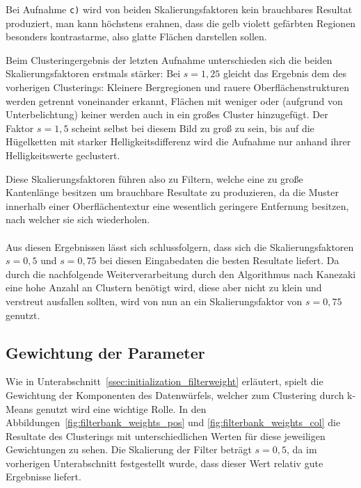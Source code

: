 Bei Aufnahme \texttt{c)} wird von beiden Skalierungsfaktoren kein brauchbares Resultat produziert, man kann höchstens erahnen, dass die gelb \bzw violett gefärbten Regionen besonders kontrastarme, also glatte Flächen darstellen sollen.

Beim Clusteringergebnis der letzten Aufnahme unterschieden sich die beiden Skalierungsfaktoren erstmals stärker: Bei $s=1,25$ gleicht das Ergebnis dem des vorherigen Clusterings: Kleinere Bergregionen und rauere Oberflächenstrukturen werden getrennt voneinander erkannt, Flächen mit weniger oder (aufgrund von Unterbelichtung) keiner werden auch in ein großes Cluster hinzugefügt. Der Faktor $s=1,5$ scheint selbst bei diesem Bild zu groß zu sein, bis auf die Hügelketten mit starker Helligkeitsdifferenz wird die Aufnahme nur anhand ihrer Helligkeitswerte geclustert.

Diese Skalierungsfaktoren führen also zu Filtern, welche eine zu große Kantenlänge besitzen um brauchbare Resultate zu produzieren, da die Muster innerhalb einer Oberflächentextur eine wesentlich geringere Entfernung besitzen, nach welcher sie sich wiederholen.

\paragraph{}
Aus diesen Ergebnissen lässt sich schlussfolgern, dass sich die Skalierungsfaktoren $s=0,5$ und $s=0,75$ bei diesen Eingabedaten die besten Resultate liefert. Da durch die nachfolgende Weiterverarbeitung durch den Algorithmus nach Kanezaki eine hohe Anzahl an Clustern benötigt wird, diese aber nicht zu klein und verstreut ausfallen sollten, wird von nun an ein Skalierungsfaktor von $s=0,75$ genutzt.

\subsection{Gewichtung der Parameter}
\label{ssec:exp_filterweight}

Wie in Unterabschnitt~\ref{ssec:initialization_filterweight} erläutert, spielt die Gewichtung der Komponenten des Datenwürfels, welcher zum Clustering durch k-Means genutzt wird eine wichtige Rolle. In den Abbildungen~\ref{fig:filterbank_weights_pos} und \ref{fig:filterbank_weights_col} die Resultate des Clusterings mit unterschiedlichen Werten für diese jeweiligen Gewichtungen zu sehen. Die Skalierung der Filter beträgt $s=0,5$, da im vorherigen Unterabschnitt festgestellt wurde, dass dieser Wert relativ gute Ergebnisse liefert.

